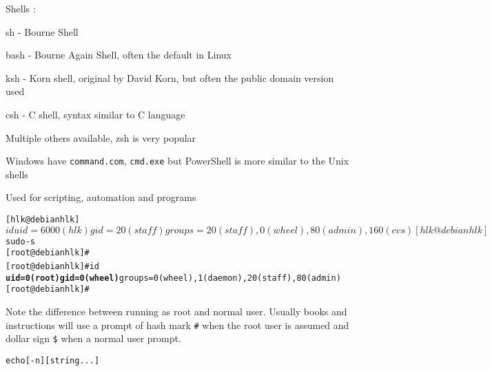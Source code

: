 \documentclass[Screen16to9,17pt]{foils}
\begin{document}

\begin{list1}
\item Shells :
  \begin{list2}
    \item sh - Bourne Shell
\item bash - Bourne Again Shell, often the default in Linux
\item ksh - Korn shell, original by David Korn, but often the public domain version used
\item csh - C shell, syntax similar to C language
\item Multiple others available, zsh is very popular
  \end{list2}
\item Windows have \verb+command.com+, \verb+cmd.exe+ but PowerShell is more similar to the Unix shells
\item Used for scripting, automation and programs
\end{list1}




\begin{alltt}
[hlk@debian hlk]$ id
uid=6000(hlk) gid=20(staff) groups=20(staff), 0(wheel), 80(admin), 160(cvs)
[hlk@debian hlk]$ sudo -s
[root@debian hlk]#
[root@debian hlk]# id {\bf
uid=0(root) gid=0(wheel)} groups=0(wheel), 1(daemon), 20(staff), 80(admin)
[root@debian hlk]#
\end{alltt}

Note the difference between running as root and normal user. Usually books and instructions will use a prompt of hash mark \verb+#+ when the root user is assumed and dollar sign \verb+$+ when a normal user prompt.


\begin{alltt}
echo [-n] [string ...]
\end{alltt}
\end{document}
